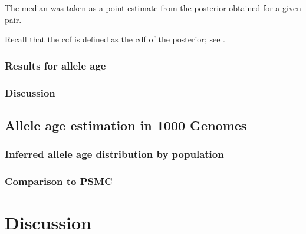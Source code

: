 The median was taken as a point estimate from the posterior obtained for a given pair.





%

%



%

%


Recall that the \gls{ccf} is defined as the \gls{cdf} of the posterior; see .
%



%
\subsubsection{Results for allele age}
%


%

%


%

%




%
\subsubsection{Discussion}
%






%
\subsection{Allele age estimation in 1000 Genomes}
%


%
\subsubsection{Inferred allele age distribution by population}
%


%
\subsubsection{Comparison to PSMC}
%







%
\section{Discussion}
%
